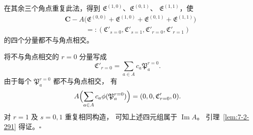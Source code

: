 在其余三个角点重复此法，得到
$\mathfrak E^{(1,0)}$、$\mathfrak E^{(0,1)}$、
$\mathfrak E^{(1,1)}$，使
\[
\begin{aligned}
&\mathbf C-A\bigl(
\mathfrak E^{(0,0)}+\mathfrak E^{(1,0)}
+\mathfrak E^{(0,1)}+\mathfrak E^{(1,1)}\bigr)\\
&\hspace{3em}=:
(\mathfrak C'_{s=0},\mathfrak C'_{s=1},
\mathfrak C'_{r=0},\mathfrak C'_{r=1})
\end{aligned}
\]
的四个分量都不与角点相交。

将不与角点相交的 $r=0$ 分量写成
\[
\mathfrak C'_{r=0}
=\sum_{a\in A}c_a\mathfrak P_a^{r=0}.
\]
由于每个 $\mathfrak P_a^{r=0}$ 都不与角点相交，
有
\[
A\Bigl(\sum_{a\in A}c_a\phi(\mathfrak P_a^{r=0})\Bigr)
=(0,0,\mathfrak C'_{r=0},0).
\]
对 $r=1$ 及 $s=0,1$ 重复相同构造，
可知上述四元组属于 $\operatorname{Im}A$。
引理~\ref{lem:7-2-291} 得证。$\square$
